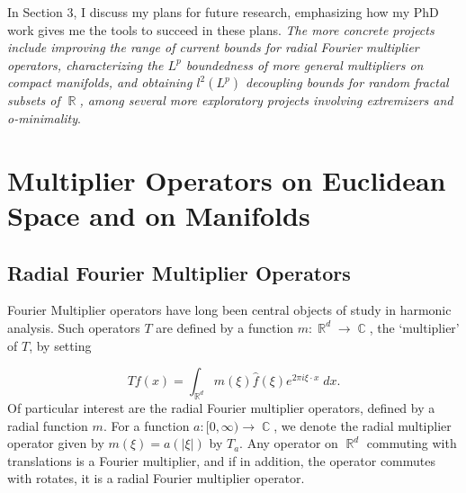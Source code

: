 \documentclass[11pt]{article}
\DeclareMathOperator{\RR}{\mathbb{R}}
\DeclareMathOperator{\CC}{\mathbb{C}}
\begin{document}

In Section 3, I discuss my plans for future research, emphasizing how my PhD work gives me the tools to succeed in these plans. \emph{The more concrete projects include improving the range of current bounds for radial Fourier multiplier operators, characterizing the $L^p$ boundedness of more general multipliers on compact manifolds, and obtaining $l^2(L^p)$ decoupling bounds for random fractal subsets of $\RR$, among several more exploratory projects involving extremizers and o-minimality}.

\section{Multiplier Operators on Euclidean Space and on Manifolds} \label{Section1}



\subsection{Radial Fourier Multiplier Operators}

Fourier Multiplier operators have long been central objects of study in harmonic analysis. Such operators $T$ are defined by a function $m: \RR^d \to \CC$, the `multiplier' of $T$, by setting

%
\[ Tf(x) = \int_{\RR^d} m(\xi) \widehat{f}(\xi) e^{2 \pi i \xi \cdot x}\; dx. \]
%
Of particular interest are the radial Fourier multiplier operators, defined by a radial function $m$. For a function $a: [0,\infty) \to \CC$, we denote the radial multiplier operator given by $m(\xi) = a(|\xi|)$ by $T_a$. Any operator on $\RR^d$ commuting with translations is a Fourier multiplier, and if in addition, the operator commutes with rotates, it is a radial Fourier multiplier operator. %
\end{document}
